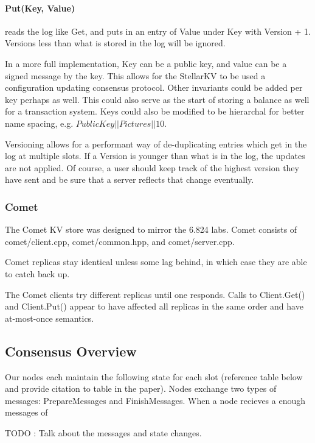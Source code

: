 \documentclass[preprint,11pt]{article} \usepackage{amsmath}
\begin{document}
\paragraph{Put(Key, Value)}  reads the log like Get, and puts in an entry of Value under Key with Version + 1. Versions less than what is stored in the log will be ignored.

In a more full implementation, Key can be a public key, and value can
be a signed message by the key. This allows for the StellarKV to be
used a configuration updating consensus protocol. Other invariants
could be added per key perhaps as well. This could also serve as the
start of storing a balance as well for a transaction system. Keys
could also be modified to be hierarchal for better name spacing, e.g.
$Public Key||Pictures||10$.

Versioning allows for a performant way of de-duplicating entries which
get in the log at multiple slots. If a Version is younger than what is
in the log, the updates are not applied. Of course, a user should keep
track of the highest version they have sent and be sure that a server
reflects that change eventually.

\subsubsection*{Comet}

The Comet KV store was designed to mirror the 6.824 labs. Comet consists of
comet/client.cpp, comet/common.hpp, and comet/server.cpp.

Comet replicas stay identical unless some lag behind, in which case they 
are able to catch back up.

The Comet clients try different replicas until one responds. Calls to Client.Get() and
Client.Put() appear to have affected all replicas in the same order and have
at-most-once semantics.

\subsection{Consensus Overview}

Our nodes each maintain the following state for each slot (reference table below and provide citation to table in the paper). Nodes exchange two types of messages: PrepareMessages and FinishMessages. When a node recieves a enough messages of 

TODO : Talk about the messages and state changes.
\end{document}
